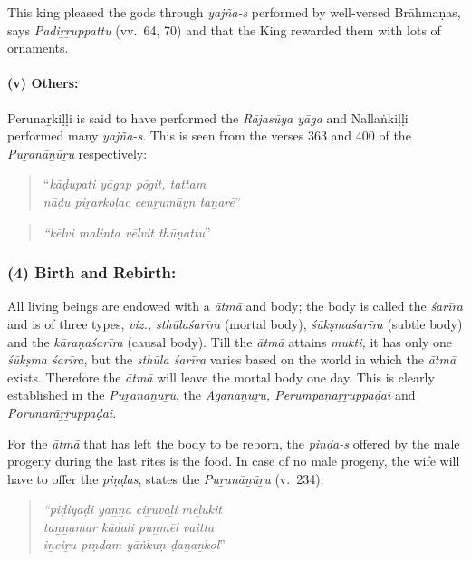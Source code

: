 This king pleased the gods through \textit{yajña-s} performed by well-versed Brāhmaṇas, says \textit{Padiṟṟuppattu} (vv.~64, 70) and that the King rewarded them with lots of ornaments.


\paragraph*{(v) Others:}

\vskip -7pt

Perunaṟkiḷḷi is said to have performed the \textit{Rājasūya yāga} and Nallaṅkiḷḷi performed many \textit{yajña-s}. This is seen from the verses 363 and 400 of the \textit{Puṟanāṉūṟu} respectively:

\begin{quote}
“\textit{kāḍupati yāgap pōgit, tattam}\\\textit{nāḍu piṟarkoḷac cenṟumāyn taṉarē}”
\end{quote}

\begin{quote}
\textit{“kēlvi malinta vēlvit thūṇattu}”
\end{quote}



\subsubsection*{(4) Birth and Rebirth:}

\vskip -7pt

All living beings are endowed with a \textit{ātmā} and body; the body is called the \textit{śarīra} and is of three types, \textit{viz., sthūlaśarīra} (mortal body), \textit{śūkṣmaśarīra} (subtle body) and the \textit{kāraṇaśarīra} (causal body). Till the \textit{ātmā} attains \textit{mukti,} it has only one \textit{śūkṣma śarīra}, but the \textit{sthūla śarīra} varies based on the world in which the \textit{ātmā} exists. Therefore the \textit{ātmā} will leave the mortal body one day. This is clearly established in the \textit{Puṟanāṉūṟu}, the \textit{Aganāṉūṟu, Perumpāṇāṟṟuppaḍai} and \textit{Porunarāṟṟuppaḍai}.

For the \textit{ātmā} that has left the body to be reborn, the \textit{piṇḍa-s} offered by the male progeny during the last rites is the food. In case of no male progeny, the wife will have to offer the \textit{piṇḍas}, states the \textit{Puṟanāṉūṟu} (v.~234):

\begin{quote}
\textit{“piḍiyaḍi yaṉṉa ciṟuvaḻi meḻukit}\\\textit{taṉṉamar kādali puṉmēl vaitta}\\\textit{iṉciṟu piṇḍam yāṅkuṇ ḍaṉaṉkol}”
\end{quote}

